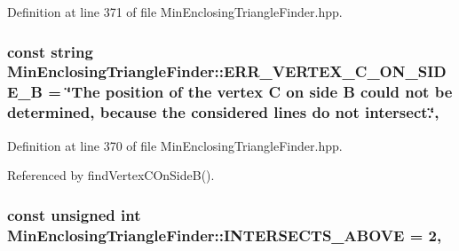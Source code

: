 Definition at line 371 of file Min\-Enclosing\-Triangle\-Finder.\-hpp.

\hypertarget{classmultiscale_1_1MinEnclosingTriangleFinder_a8e551d77bc36b7696ea969823f5720d1}{
\subsubsection[{E\-R\-R\-\_\-\-V\-E\-R\-T\-E\-X\-\_\-\-C\-\_\-\-O\-N\-\_\-\-S\-I\-D\-E\-\_\-\-B}]{\setlength{\rightskip}{0pt plus 5cm}const string Min\-Enclosing\-Triangle\-Finder\-::\-E\-R\-R\-\_\-\-V\-E\-R\-T\-E\-X\-\_\-\-C\-\_\-\-O\-N\-\_\-\-S\-I\-D\-E\-\_\-\-B = \char`\"{}The position of the vertex C on side B could not be determined, because the considered lines do not intersect.\char`\"{}\hspace{0.3cm}{\ttfamily [static]}, {\ttfamily [private]}}}\label{classmultiscale_1_1MinEnclosingTriangleFinder_a8e551d77bc36b7696ea969823f5720d1}


Definition at line 370 of file Min\-Enclosing\-Triangle\-Finder.\-hpp.



Referenced by find\-Vertex\-C\-On\-Side\-B().

\hypertarget{classmultiscale_1_1MinEnclosingTriangleFinder_ab44440be62a75f528ccc11753ce66b52}{
\subsubsection[{I\-N\-T\-E\-R\-S\-E\-C\-T\-S\-\_\-\-A\-B\-O\-V\-E}]{\setlength{\rightskip}{0pt plus 5cm}const unsigned int Min\-Enclosing\-Triangle\-Finder\-::\-I\-N\-T\-E\-R\-S\-E\-C\-T\-S\-\_\-\-A\-B\-O\-V\-E = 2\hspace{0.3cm}{\ttfamily [static]}, {\ttfamily [private]}}}\label{classmultiscale_1_1MinEnclosingTriangleFinder_ab44440be62a75f528ccc11753ce66b52}


